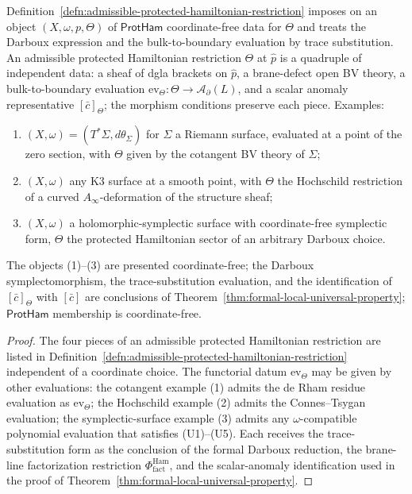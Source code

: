 \begin{lem}\label{lem:protham-non-tautology}
  Definition~\ref{defn:admissible-protected-hamiltonian-restriction}
  imposes on an object \((X,\omega,p,\Theta)\) of \(\mathsf{ProtHam}\)
  coordinate-free data for \(\Theta\) and treats the Darboux expression
  and the bulk-to-boundary evaluation by
  trace substitution.  An admissible protected Hamiltonian restriction
  \(\Theta\) at \(\widehat p\) is a quadruple of independent data:
  a sheaf of dgla brackets on \(\widehat p\), a brane-defect open BV
  theory, a bulk-to-boundary evaluation
  \(\mathrm{ev}_\Theta\colon\Theta\to\mathcal A_\partial(L)\), and a
  scalar anomaly representative \([\bar c]_\Theta\); the morphism
  conditions preserve each piece.  Examples:
  \begin{enumerate}[label=(\arabic*)]
    \item \((X,\omega)=(T^*\Sigma,d\theta_\Sigma)\) for \(\Sigma\) a
      Riemann surface, evaluated at a point of the zero section, with
      \(\Theta\) given by the cotangent BV theory of \(\Sigma\);
    \item \((X,\omega)\) any K3 surface at a smooth point, with
      \(\Theta\) the Hochschild restriction of a curved
      \(A_\infty\)-deformation of the structure sheaf;
    \item \((X,\omega)\) a holomorphic-symplectic surface with
      coordinate-free symplectic form, \(\Theta\) the
  protected Hamiltonian sector of an arbitrary Darboux choice.
  \end{enumerate}
  The objects (1)--(3) are presented coordinate-free; the Darboux
  symplectomorphism, the trace-substitution evaluation, and the
  identification of \([\bar c]_\Theta\) with \([\bar c]\) are
  conclusions of
  Theorem~\ref{thm:formal-local-universal-property}; \(\mathsf{ProtHam}\)
  membership is coordinate-free.
\end{lem}

\begin{proof}
  The four pieces of an admissible protected Hamiltonian restriction
  are listed in
  Definition~\ref{defn:admissible-protected-hamiltonian-restriction}
  independent of a coordinate choice.  The functorial datum
  \(\mathrm{ev}_\Theta\) may be given by other evaluations:
  the cotangent example (1) admits the de Rham residue evaluation as
  \(\mathrm{ev}_\Theta\); the Hochschild example (2) admits the
  Connes--Tsygan evaluation; the symplectic-surface example (3)
  admits any \(\omega\)-compatible polynomial evaluation that
  satisfies (U1)--(U5).  Each receives the trace-substitution form as
  the conclusion of the formal Darboux reduction, the brane-line
  factorization restriction
  \(\Phi^{\mathrm{Ham}}_{\mathrm{fact}}\), and the scalar-anomaly
  identification used in the proof of
  Theorem~\ref{thm:formal-local-universal-property}.
\end{proof}

